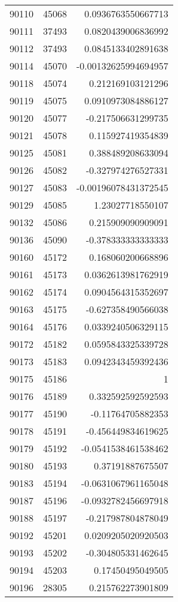\begin{tabular}{r | r | r}
90110 & 45068 & 0.0936763550667713 \\
90111 & 37493 & 0.0820439006836992 \\
90112 & 37493 & 0.0845133402891638 \\
90114 & 45070 & -0.00132625994694957 \\
90118 & 45074 & 0.212169103121296 \\
90119 & 45075 & 0.0910973084886127 \\
90120 & 45077 & -0.217506631299735 \\
90121 & 45078 & 0.115927419354839 \\
90125 & 45081 & 0.388489208633094 \\
90126 & 45082 & -0.327974276527331 \\
90127 & 45083 & -0.00196078431372545 \\
90129 & 45085 & 1.23027718550107 \\
90132 & 45086 & 0.215909090909091 \\
90136 & 45090 & -0.378333333333333 \\
90160 & 45172 & 0.168060200668896 \\
90161 & 45173 & 0.0362613981762919 \\
90162 & 45174 & 0.0904564315352697 \\
90163 & 45175 & -0.627358490566038 \\
90164 & 45176 & 0.0339240506329115 \\
90172 & 45182 & 0.0595843325339728 \\
90173 & 45183 & 0.0942343459392436 \\
90175 & 45186 & 1 \\
90176 & 45189 & 0.332592592592593 \\
90177 & 45190 & -0.11764705882353 \\
90178 & 45191 & -0.456449834619625 \\
90179 & 45192 & -0.0541538461538462 \\
90180 & 45193 & 0.37191887675507 \\
90183 & 45194 & -0.0631067961165048 \\
90187 & 45196 & -0.0932782456697918 \\
90188 & 45197 & -0.217987804878049 \\
90192 & 45201 & 0.0209205020920503 \\
90193 & 45202 & -0.304805331462645 \\
90194 & 45203 & 0.17450495049505 \\
90196 & 28305 & 0.215762273901809 \\

\end{tabular}
